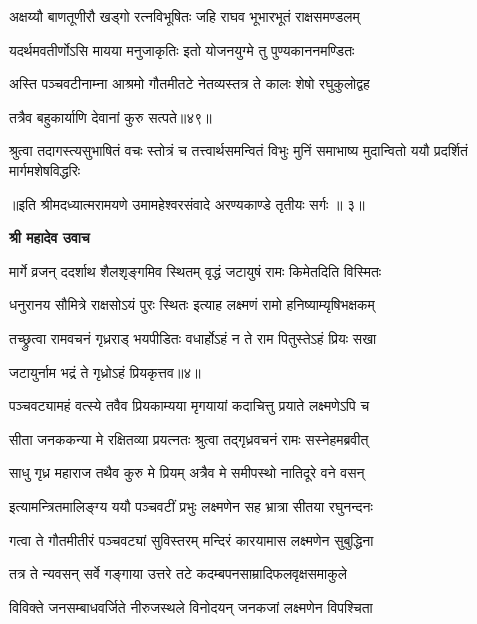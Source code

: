 \twolineshloka
{अक्षय्यौ बाणतूणीरौ खड्गो रत्नविभूषितः}
{जहि राघव भूभारभूतं राक्षसमण्डलम्} %

\twolineshloka
{यदर्थमवतीर्णोऽसि मायया मनुजाकृतिः}
{इतो योजनयुग्मे तु पुण्यकाननमण्डितः} %

\twolineshloka
{अस्ति पञ्चवटीनाम्ना आश्रमो गौतमीतटे}
{नेतव्यस्तत्र ते कालः शेषो रघुकुलोद्वह} %

{तत्रैव बहुकार्याणि देवानां कुरु सत्पते॥४९॥} %


\fourlineindentedshloka
{श्रुत्वा तदागस्त्यसुभाषितं वचः}
{स्तोत्रं च तत्त्वार्थसमन्वितं विभुः}
{मुनिं समाभाष्य मुदान्वितो ययौ}
{प्रदर्शितं मार्गमशेषविद्धरिः} %

{॥इति श्रीमदध्यात्मरामयणे उमामहेश्वरसंवादे
अरण्यकाण्डे तृतीयः सर्गः ॥ ३॥
}




\textbf{श्री महादेव उवाच}

\twolineshloka
{मार्गे व्रजन् ददर्शाथ शैलशृङ्गमिव स्थितम्}
{वृद्धं जटायुषं रामः किमेतदिति विस्मितः} %

\twolineshloka
{धनुरानय सौमित्रे राक्षसोऽयं पुरः स्थितः}
{इत्याह लक्ष्मणं रामो हनिष्याम्यृषिभक्षकम्} %

\twolineshloka
{तच्छ्रुत्वा रामवचनं गृध्रराड् भयपीडितः}
{वधार्होऽहं न ते राम पितुस्तेऽहं प्रियः सखा} %

{जटायुर्नाम भद्रं ते गृध्रोऽहं प्रियकृत्तव॥४॥} %


\twolineshloka
{पञ्चवट्यामहं वत्स्ये तवैव प्रियकाम्यया}
{मृगयायां कदाचित्तु प्रयाते लक्ष्मणेऽपि च} %

\twolineshloka
{सीता जनककन्या मे रक्षितव्या प्रयत्नतः}
{श्रुत्वा तद्गृध्रवचनं रामः सस्नेहमब्रवीत्} %

\twolineshloka
{साधु गृध्र महाराज तथैव कुरु मे प्रियम्}
{अत्रैव मे समीपस्थो नातिदूरे वने वसन्} %

\twolineshloka
{इत्यामन्त्रितमालिङ्ग्य ययौ पञ्चवटीं प्रभुः}
{लक्ष्मणेन सह भ्रात्रा सीतया रघुनन्दनः} %

\twolineshloka
{गत्वा ते गौतमीतीरं पञ्चवट्यां सुविस्तरम्}
{मन्दिरं कारयामास लक्ष्मणेन सुबुद्धिना} %

\twolineshloka
{तत्र ते न्यवसन् सर्वे गङ्गाया उत्तरे तटे}
{कदम्बपनसाम्रादिफलवृक्षसमाकुले} %

\twolineshloka
{विविक्ते जनसम्बाधवर्जिते नीरुजस्थले}
{विनोदयन् जनकजां लक्ष्मणेन विपश्चिता} %

